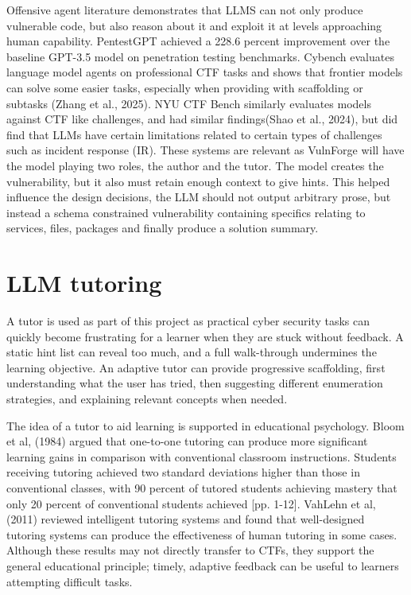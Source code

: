 Offensive agent literature demonstrates that LLMS can not only produce vulnerable code, but also reason about it and exploit it at levels approaching human capability. PentestGPT\cite{deng_pentestgpt_2024} achieved a 228.6 percent improvement over the baseline GPT-3.5 model on penetration testing benchmarks. Cybench evaluates language model agents on professional CTF tasks and shows that frontier models can solve some easier tasks, especially when providing with scaffolding or subtasks (Zhang et al., 2025)\cite{zhang_cybench_2025}. NYU CTF Bench similarly evaluates models against CTF like challenges, and had similar findings(Shao et al., 2024)\cite{shao_nyu_2025}, but did find that LLMs have certain limitations related to certain types of challenges such as incident response (IR). These systems are relevant as VulnForge will have the model playing two roles, the author and the tutor. The model creates the vulnerability, but it also must retain enough context to give hints. This helped influence the design  decisions, the LLM should not output arbitrary prose, but instead a schema constrained vulnerability containing specifics relating to services, files, packages and finally produce a solution summary. 

\section{LLM tutoring}\label{sec:llm-tutoring}
A tutor is used as part of this project as practical cyber security tasks can quickly become frustrating for a learner when they are stuck without feedback. A static hint list can reveal too much, and a full walk-through undermines the learning objective. An adaptive tutor can provide progressive scaffolding, first understanding what the user has tried, then suggesting different enumeration strategies, and explaining relevant concepts when needed. 

The idea of a tutor to aid learning is supported in educational psychology. Bloom et al, (1984) \cite{bloom_2_1984} argued that one-to-one tutoring can produce more significant learning gains in comparison with conventional classroom instructions. Students receiving tutoring achieved two standard deviations higher than those in conventional classes, with 90 percent of tutored students achieving mastery that only 20 percent of conventional students achieved [pp. 1-12].  VahLehn et al, (2011)\cite{vanlehn_relative_2011} reviewed intelligent tutoring systems and found that well-designed tutoring systems can produce the effectiveness of human tutoring in some cases. Although these results may not directly transfer to CTFs, they support the general educational principle; timely, adaptive feedback can be useful to learners attempting difficult tasks. 

